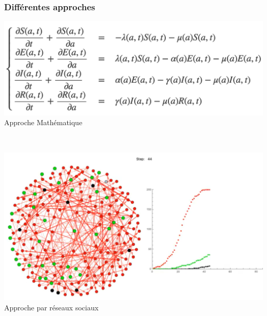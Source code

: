 \documentclass[a4paper]{cours-bdd}
\begin{document}
\begin{frame}[fragile]
  \frametitle{Différentes approches}

  \begin{minipage}[b]{0.45\columnwidth}
    \vspace{0.0cm}
    \includegraphics[width=\linewidth]{approcheMath.png} \\
    Approche Mathématique 
      \end{minipage}    
  \hfill \ 
  \begin{minipage}[b]{0.45\columnwidth}
        \vspace{0.0cm}
        \includegraphics[width=0.8\linewidth]{approcheNetwork.png} \\
        Approche par réseaux sociaux
      \end{minipage}
      \ 


\end{frame}
\end{document}
